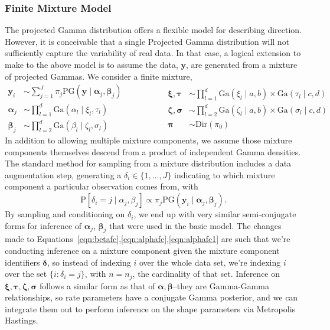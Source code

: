 \subsubsection{Finite Mixture Model}
The projected Gamma distribution offers a flexible model for describing direction.  However, it is
  conceivable that a single Projected Gamma distribution will not sufficiently capture the
  variability of real data.  In that case, a logical extension to make to the above model is to
  assume the data, $\bm{ y}$, are generated from a mixture of projected Gammas.  We consider a finite
  mixture,
  \begin{equation}
    \label{eqn:fmixp}
    \begin{aligned}
      \bm{ y}_i &\sim \sum_{j = 1}^J\pi_j\text{PG}\left(\bm{ y}\mid \bm{ \alpha}_j, \bm{ \beta}_j\right)\\
      \bm{ \alpha}_j &\sim {\textstyle \prod}_{l = 1}^d \text{Ga}\left(\alpha_l\mid\xi_l,\tau_l\right)\\
      \bm{ \beta}_j &\sim {\textstyle \prod}_{l = 2}^d \text{Ga}\left(\beta_l\mid\zeta_l,\sigma_l\right)
    \end{aligned}
    \hspace{2cm}
    \begin{aligned}
      \bm{ \xi},\bm{\tau} &\sim {\textstyle \prod}_{l = 1}^d \text{Ga}(\xi_l\mid a,b) \times \text{Ga}(\tau_l\mid c,d)\\
      \bm{ \zeta},\bm{\sigma} &\sim {\textstyle\prod}_{l = 2}^d\text{Ga}(\zeta_l \mid a,b)\times \text{Ga}(\sigma_l\mid c,d)\\
      \bm{ \pi} &\sim \text{Dir}(\pi_0)
    \end{aligned}
  \end{equation}
  In addition to allowing multiple mixture components, we assume those mixture components themselves
  descend from a product of independent Gamma densities. The standard method for sampling from a
  mixture distribution includes a data augmentation step, generating a
  $\delta_i \in \lbrace 1,\ldots, J\rbrace$ indicating to which mixture component a
  particular observation comes from, with
  \begin{equation*}
    \text{P}\left[\delta_i = j\mid\alpha_j,\beta_j\right] \propto \pi_j\text{PG}\left(\bm{ y}_i\mid \bm{ \alpha}_j,\bm{ \beta}_j\right).
  \end{equation*}
  By sampling and conditioning on $\delta_i$, we end up with very similar semi-conjugate forms for
  inference of $\bm{ \alpha}_j$, $\bm{ \beta}_j$ that were used in the basic model.  The changes made
  to Equations~\ref{eqn:betafc},\ref{eqn:alphafc},\ref{eqn:alphafc1} are such that we're conducting inference
  on a mixture component given the mixture component identifiers $\bm{ \delta}$, so instead of indexing
  $i$ over the whole data set, we're indexing $i$ over the set $\{i :\delta_i = j\}$, with $n = n_j$,
  the cardinality of that set. Inference on $\bm{ \xi,\tau,\zeta,\sigma}$ follows a similar form as
  that of $\bm{ \alpha,\beta}$--they are Gamma-Gamma relationships, so rate parameters have a conjugate
  Gamma posterior, and we can integrate them out to perform inference on the shape parameters via
  Metropolis Hastings.

